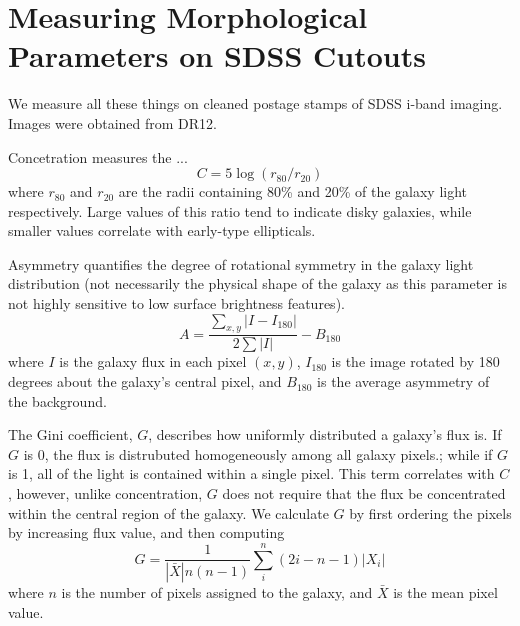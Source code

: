 \documentclass[twocolumn]{aastex6}
\newcommand{\rr}[1]{$r_{#1}$}
\begin{document}
\appendix

\section{Measuring Morphological Parameters on SDSS Cutouts}
\label{sec:Appendix}

We measure all these things on cleaned postage stamps of SDSS i-band imaging. 
Images were obtained from DR12. 


Concetration measures the ... 
\begin{equation}
C = 5\log(r_{80}/ r_{20})
\end{equation}
where \rr{80} and \rr{20} are the radii containing 80\% and 20\% of the galaxy light respectively.  Large values of this ratio tend to indicate disky galaxies, while smaller values correlate with early-type ellipticals. 

Asymmetry quantifies the degree of rotational symmetry in the galaxy light distribution (not necessarily the physical shape of the galaxy as this parameter is not highly sensitive to low surface brightness features).  
\begin{equation}
A = \frac{\sum_{x,y} |I - I_{180}|}{ 2\sum|I|} - B_{180}
\end{equation}
where $I$ is the galaxy flux in each pixel $(x, y)$, $I_{180}$ is the image rotated by 180 degrees about the galaxy's central pixel, and $B_{180}$ is the average asymmetry of the background. 

The Gini coefficient, $G$, describes how uniformly distributed a galaxy's flux is.  If $G$ is 0, the flux is distrubuted homogeneously among all galaxy pixels.; while if $G$ is 1,  all of the light is contained within a single pixel. This term correlates with $C$, however, unlike concentration, $G$ does not require that the flux be concentrated within the central region of the galaxy.  We calculate $G$ by first ordering the pixels by increasing flux value, and then computing
\begin{equation}
G = \frac{1}{|\bar X|n(n-1)}\sum_i^n(2i-n-1)|X_i|
\end{equation}
where $n$ is the number of pixels assigned to the galaxy, and $\bar X$ is the mean pixel value. 
\end{document}
